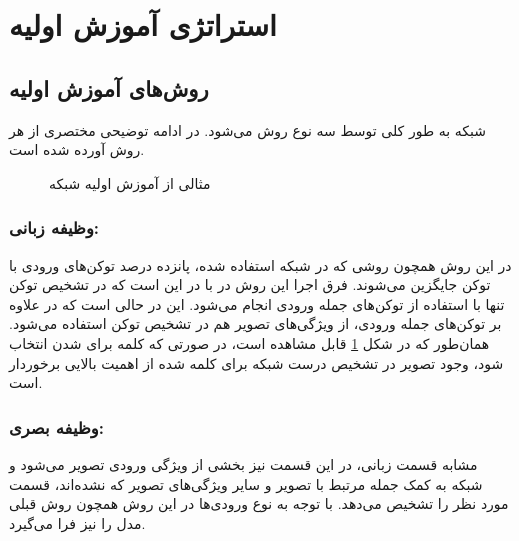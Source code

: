 \section{استراتژی آموزش اولیه 
}
\subsection{ روش‌های آموزش اولیه}

شبکه 
به طور کلی توسط سه نوع روش
می‌شود. در ادامه توضیحی مختصری از هر روش آورده شده است.
\begin{figure}[H]
	\caption{مثالی از آموزش اولیه
	شبکه
	  \cite{tan2019lxmert}}
	\label{lxmert-pretrain}
\end{figure}
\subsubsection{وظیفه زبانی:
	}
در این روش همچون روشی که در شبکه
استفاده شده، پانزده درصد توکن‌های ورودی با توکن
جایگزین می‌شوند. فرق اجرا این روش در 
با 
در این است که در 
تشخیص توکن
تنها با استفاده از توکن‌های جمله ورودی انجام می‌شود. این در حالی است که در 
علاوه بر توکن‌های جمله ورودی، از ویژگی‌های تصویر هم در تشخیص توکن
استفاده می‌شود. همان‌طور که در شکل 
\ref{lxmert-pretrain}
قابل مشاهده است، در صورتی که کلمه
برای 
شدن انتخاب شود،
وجود تصویر در تشخیص درست شبکه برای کلمه 
شده از اهمیت بالایی برخوردار است.
\subsubsection{وظیفه بصری:
	}
مشابه قسمت زبانی، در این قسمت نیز بخشی از ویژگی ورودی تصویر
می‌شود و شبکه به کمک جمله مرتبط با تصویر و سایر ویژگی‌های تصویر که
نشده‌اند، قسمت مورد نظر را تشخیص می‌دهد. با توجه به نوع ورودی‌ها در این روش همچون روش قبلی مدل
را نیز فرا می‌گیرد. 

